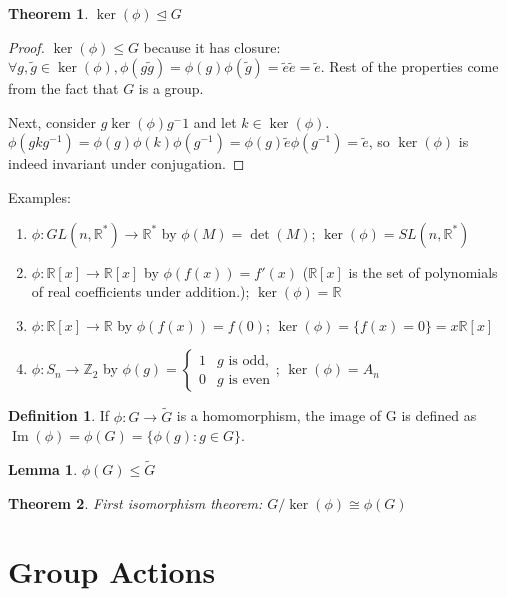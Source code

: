 \documentclass{article}
\theoremstyle{definition}
\newtheorem{definition}{Definition}
\theoremstyle{plain}
\newtheorem{theorem}{Theorem}
\theoremstyle{corollary}
\theoremstyle{lemma}
\newtheorem{lemma}{Lemma}
\DeclareMathOperator{\Img}{Im}
\begin{document}
\begin{theorem}
    $\ker(\phi)\unlhd G$
\end{theorem}

\begin{proof}
    $\ker(\phi)\leq G$ because it has closure: $\forall g,\tilde g\in \ker(\phi),\phi(g\tilde g)=\phi(g)\phi(\tilde{g})=\tilde e\tilde e=\tilde e$. Rest of the properties come from the fact that $G$ is a group.

    Next, consider $g\ker(\phi)g^-1$ and let $k\in \ker(\phi)$. $\phi(gkg^{-1})=\phi(g)\phi(k)\phi(g^{-1})=\phi(g)\tilde e\phi(g^{-1})=\tilde e$, so $\ker(\phi)$ is indeed invariant under conjugation.
\end{proof}

Examples:
\begin{enumerate}
    \item $\phi:GL(n,\mathbb{R}^*)\rightarrow\mathbb{R}^*$ by $\phi(M)=\det(M)$; $\ker(\phi)=SL(n,\mathbb{R}^*)$
    \item $\phi:\mathbb{R}[x]\rightarrow\mathbb{R}[x]$ by $\phi(f(x))=f'(x)$ ($\mathbb{R}[x]$ is the set of polynomials of real coefficients under addition.); $\ker(\phi)=\mathbb{R}$
    \item $\phi:\mathbb{R}[x]\rightarrow\mathbb{R}$ by $\phi(f(x))=f(0)$; $\ker(\phi)=\{f(x)=0\}=x\mathbb{R}[x]$
    \item $\phi:S_n\rightarrow \mathbb Z_2$ by $\phi(g)=\begin{cases}
        1 & g\text{ is odd,}\\
        0 & g\text{ is even}
    \end{cases}$; $\ker(\phi)=A_n$
\end{enumerate}

\begin{definition}
    If $\phi:G\rightarrow\tilde G$ is a homomorphism, the image of G is defined as $\Img(\phi)=\phi(G)=\{\phi(g):g\in G\}$.
\end{definition}

\begin{lemma}
$\phi(G)\leq\tilde G$
\end{lemma}

\begin{theorem}
First isomorphism theorem: $G/\ker(\phi)\cong\phi(G)$
\end{theorem}

\section{Group Actions}
\end{document}
